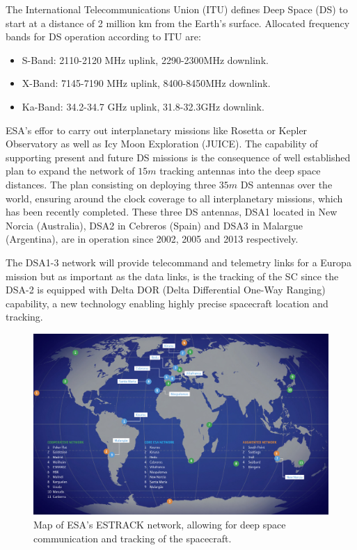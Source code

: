 
The International Telecommunications Union (ITU) defines Deep Space (DS) to start at a distance of 2 million km from the Earth's surface. Allocated frequency bands for DS operation according to ITU are:

\begin{itemize}
    \item S-Band: 2110-2120 MHz uplink, 2290-2300MHz downlink.
    \item X-Band: 7145-7190 MHz uplink, 8400-8450MHz downlink.
    \item Ka-Band: 34.2-34.7 GHz uplink, 31.8-32.3GHz downlink.
\end{itemize}


ESA's effor to carry out interplanetary missions like Rosetta or Kepler Observatory as well as Icy Moon Exploration (JUICE). The capability of supporting present and future DS missions is the consequence of well established plan to expand the network of $15m$ tracking antennas into the deep space distances. The plan consisting on deploying three $35m$ DS antennas over the world, ensuring around the clock coverage to all interplanetary missions, which has been recently completed. These three DS antennas, DSA1 located in New Norcia (Australia), DSA2 in Cebreros (Spain) and DSA3 in Malargue (Argentina), are in operation since 2002, 2005 and 2013 respectively.

The DSA1-3 network will provide telecommand and telemetry links for a Europa mission but as important as the data links, is the tracking of the SC since the DSA-2 is equipped with Delta DOR (Delta Differential One-Way Ranging) capability, a new technology enabling highly precise spacecraft location and tracking.

\begin{figure}[htb]
	\centering
	\includegraphics[width=\textwidth]{figures/comms/ESTRACK-map}
	\caption{Map of ESA's ESTRACK network, allowing for deep space communication and tracking of the spacecraft.}
	\label{fig:ESTRACK-map}
\end{figure}

